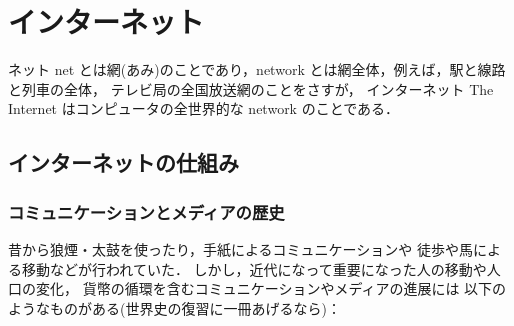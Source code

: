 %
%
%   
%
%

\chapter{インターネット}
ネット net とは網(あみ)のことであり，network とは網全体，例えば，駅と線路と列車の全体，
テレビ局の全国放送網のことをさすが，
インターネット The Internet はコンピュータの全世界的な network のことである．

\section{インターネットの仕組み}
\subsection{コミュニケーションとメディアの歴史}
昔から狼煙・太鼓を使ったり，手紙によるコミュニケーションや
徒歩や馬による移動などが行われていた．
しかし，近代になって重要になった人の移動や人口の変化，
貨幣の循環を含むコミュニケーションやメディアの進展には
以下のようなものがある(世界史の復習に一冊あげるなら\cite{Yamakawa})：


